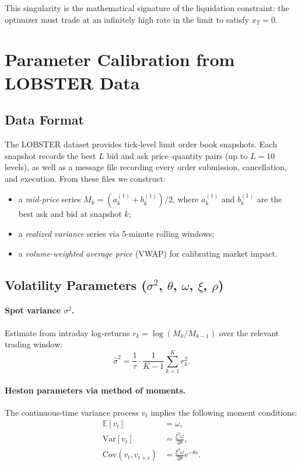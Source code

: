 \documentclass[11pt]{article}
\begin{document}
This singularity is the mathematical signature of the liquidation constraint: the optimizer must trade at an infinitely high rate in the limit to satisfy $x_T = 0$.

\section{Parameter Calibration from LOBSTER Data}
\label{app:calibration}

\subsection{Data Format}

The LOBSTER dataset \cite{huang2011lobster} provides tick-level limit order book snapshots. Each snapshot records the best $L$ bid and ask price--quantity pairs (up to $L=10$ levels), as well as a message file recording every order submission, cancellation, and execution. From these files we construct:
\begin{itemize}
\item a \emph{mid-price} series $M_k = (a_k^{(1)} + b_k^{(1)})/2$, where $a_k^{(1)}$ and $b_k^{(1)}$ are the best ask and bid at snapshot $k$;
\item a \emph{realized variance} series via 5-minute rolling windows;
\item a \emph{volume-weighted average price} (VWAP) for calibrating market impact.
\end{itemize}

\subsection{Volatility Parameters ($\sigma^2$, $\theta$, $\omega$, $\xi$, $\rho$)}

\paragraph{Spot variance $\sigma^2$.}
Estimate from intraday log-returns $r_k = \log(M_k/M_{k-1})$ over the relevant trading window:
\[
\hat\sigma^2 = \frac{1}{\tau}\cdot\frac{1}{K-1}\sum_{k=1}^K r_k^2.
\]

\paragraph{Heston parameters via method of moments.}
The continuous-time variance process $v_t$ implies the following moment conditions:
\begin{align*}
\mathbb{E}[v_t] &= \omega, \\
\mathrm{Var}[v_t] &= \frac{\xi^2\omega}{2\theta}, \\
\mathrm{Cov}(v_t, v_{t+s}) &= \frac{\xi^2\omega}{2\theta}e^{-\theta s}.
\end{align*}
\end{document}
